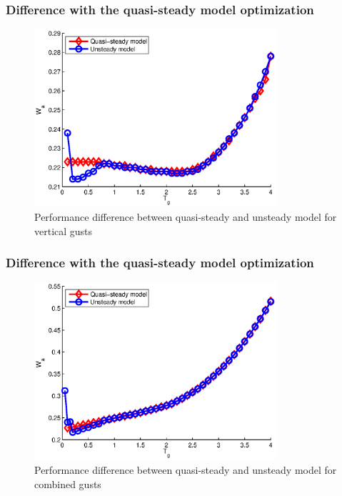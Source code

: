 \documentclass[compress]{beamer}
\begin{document}
\begin{frame}
  \frametitle{Difference with the quasi-steady model optimization}

  \begin{figure}[h]
    \centering
    \includegraphics[width=0.8\textwidth]{./Figures/LUT_vs_GK_Wg_vs_TG_windtype=1_alhpamax=12_nodalphalimit.eps}
    \caption{Performance difference between quasi-steady and unsteady model for vertical gusts}
  \end{figure}
\end{frame}


\begin{frame}
  \frametitle{Difference with the quasi-steady model optimization}

  \begin{figure}[h]
    \centering
    \includegraphics[width=0.8\textwidth]{./Figures/LUT_vs_GK_Wg_vs_TG_windtype=3_alhpamax=12_nodalphalimit.eps}
    \caption{Performance difference between quasi-steady and unsteady model for combined gusts}
  \end{figure}
\end{frame}
\end{document}
